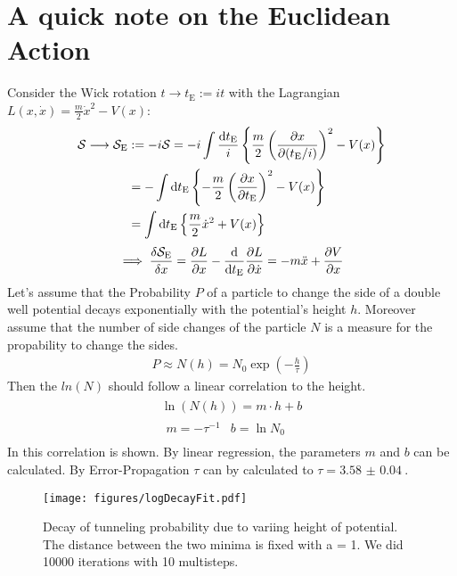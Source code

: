 \documentclass[11pt,a4paper]{scrartcl}
\newcommand{\action}{\ensuremath{\mathcal{S}}}
\newcommand{\SE}{\mathcal{S}_{\mathrm{E}}}
\newcommand{\tE}{\ensuremath{t_{\mathrm{E}}}}
\begin{document}
\section*{A quick note on the Euclidean Action}
Consider the Wick rotation $t\longrightarrow \tE:=it$ with the Lagrangian $L(x, \dot{x})=\frac{m}{2}\dot{x}^2-V(x)$:
\begin{align*}
    \action\longrightarrow\SE&:=-i\action
    =-i\int\frac{\dd\tE}{i}\left\{\frac{m}{2}\left(\pdv{x}{(\tE/i)}\right)^2-V(x)\right\} \\
    &=-\int\dd\tE\left\{-\frac{m}{2}\left(\pdv{x}{\tE}\right)^2-V(x)\right\} \\
    &=\int\dd\tE\left\{\frac{m}{2}\dot{x}^2+V(x)\right\}
\end{align*}
\begin{equation*}
    \implies\fdv{\SE}{x}=\pdv{L}{x}-\dv{\tE}\pdv{L}{\dot{x}}
    =-m\ddot{x}+\pdv{V}{x}
\end{equation*}
\newpage
Let's assume that the Probability $P$ of a particle to change the side of a double well potential decays exponentially with the potential's height $h$. Moreover assume that the number of side changes of the particle $N$ is a measure for the propability to change the sides.
\begin{align}
    P \approx N(h) = N_0 \exp\left( -\frac{h}{\tau}\right)\label{eq:time1}
\end{align}{}
Then the $ln(N)$ should follow a linear correlation to the height.
\begin{align}
\begin{split}
    \ln(N(h)) = m\cdot h + b\\
    \begin{array}{cc}
     m = -\tau^{-1} & b = \ln{N_0}
    \end{array}
\end{split} \label{eq:time2}
\end{align}
In  this correlation is shown. By linear regression, the parameters $m$ and $b$ can be calculated. By Error-Propagation $\tau$ can by calculated to $\tau = \SI{3.58(4)}{}$.

\begin{figure}
    \centering
    \texttt{[image: figures/logDecayFit.pdf]}
    \caption{Decay of tunneling probability due to variing height of potential. The distance between the two minima is fixed with a = 1. We did 10000 iterations with 10 multisteps.}
    \label{fig:logDecay}
\end{figure}{}



\newpage


\end{document}
